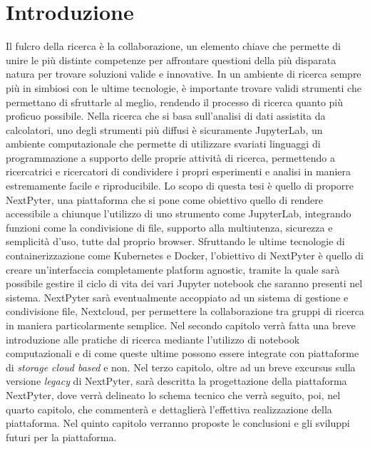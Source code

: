 \chapter{Introduzione}
Il fulcro della ricerca è la collaborazione, un elemento chiave che permette di unire le più distinte competenze per affrontare questioni della più disparata natura per trovare soluzioni valide e innovative. In un ambiente di ricerca sempre più in simbiosi con le ultime tecnologie, è importante trovare validi strumenti che permettano di sfruttarle al meglio, rendendo il processo di ricerca quanto più proficuo possibile.
\newline
\newline
Nella ricerca che si basa sull’analisi di dati assistita da calcolatori, uno degli strumenti più diffusi è sicuramente JupyterLab, un ambiente computazionale che permette di utilizzare svariati linguaggi di programmazione a supporto delle proprie attività di ricerca, permettendo a ricercatrici e ricercatori di condividere i propri esperimenti e analisi in maniera estremamente facile e riproducibile.
\newline
Lo scopo di questa tesi è quello di proporre NextPyter, una piattaforma che si pone come obiettivo quello di rendere accessibile a chiunque l’utilizzo di uno strumento come JupyterLab, integrando funzioni come la condivisione di file, supporto alla multiutenza, sicurezza e semplicità d’uso, tutte dal proprio browser.
\newline
Sfruttando le ultime tecnologie di containerizzazione come Kubernetes e Docker, l'obiettivo di NextPyter è quello di creare un'interfaccia completamente platform agnostic, tramite la quale sarà possibile gestire il ciclo di vita dei vari Jupyter notebook che saranno presenti nel sistema. NextPyter sarà eventualmente accoppiato ad un sistema di gestione e condivisione file, Nextcloud, per permettere la collaborazione tra gruppi di ricerca in maniera particolarmente semplice.
\newline
Nel secondo capitolo verrà fatta una breve introduzione alle pratiche di ricerca mediante l'utilizzo di notebook computazionali e di come queste ultime possono essere integrate con piattaforme di \textit{storage cloud based} e non.
\newline
Nel terzo capitolo, oltre ad un breve excursus sulla versione \textit{legacy} di NextPyter, sarà descritta la progettazione della piattaforma NextPyter, dove verrà delineato lo schema tecnico che verrà seguito, poi, nel quarto capitolo, che commenterà e dettaglierà l'effettiva realizzazione della piattaforma.
\newline
Nel quinto capitolo verranno proposte le conclusioni e gli sviluppi futuri per la piattaforma.